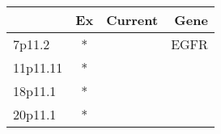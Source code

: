 \begin{tabular}{lccr}
\toprule
{} & Ex & Current &  Gene \\
\midrule
7p11.2   &  * &         &  EGFR \\
11p11.11 &  * &         &       \\
18p11.1  &  * &         &       \\
20p11.1  &  * &         &       \\
\bottomrule
\end{tabular}
